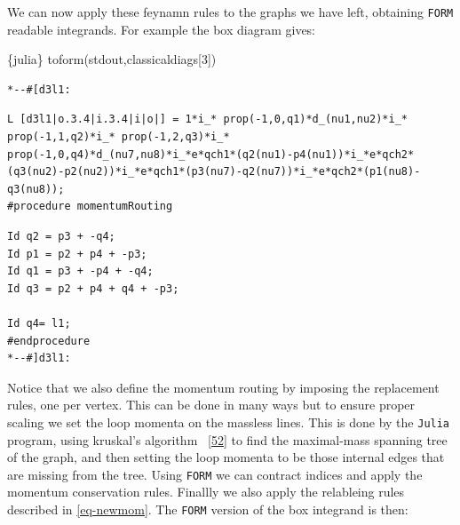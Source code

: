 \documentclass[
  10pt,
  a4paper,
  DIV=11,
  numbers=noendperiod,
  oneside]{scrreprt}
\newenvironment{Shaded}{\begin{snugshade}}{\end{snugshade}}
\newcommand{\DecValTok}[1]{\textcolor[rgb]{0.68,0.00,0.00}{#1}}
\newcommand{\InformationTok}[1]{\textcolor[rgb]{0.37,0.37,0.37}{#1}}
\newcommand{\NormalTok}[1]{\textcolor[rgb]{0.00,0.23,0.31}{#1}}
\DeclareRobustCommand{\[}{\begin{equation}}
\DeclareRobustCommand{\]}{\end{equation}}
\begin{document}
We can now apply these feynamn rules to the graphs we have left,
obtaining \texttt{FORM} readable integrands. For example the box diagram
gives:

\begin{Shaded}
\begin{Highlighting}[]
\InformationTok{\textasciigrave{}\textasciigrave{}\textasciigrave{}\{julia\}}
\NormalTok{toform(stdout,classicaldiags[}\DecValTok{3}\NormalTok{])}
\InformationTok{\textasciigrave{}\textasciigrave{}\textasciigrave{}}
\end{Highlighting}
\end{Shaded}

\begin{verbatim}
*--#[d3l1:
\end{verbatim}

\begin{verbatim}
L [d3l1|o.3.4|i.3.4|i|o|] = 1*i_* prop(-1,0,q1)*d_(nu1,nu2)*i_* prop(-1,1,q2)*i_* prop(-1,2,q3)*i_* prop(-1,0,q4)*d_(nu7,nu8)*i_*e*qch1*(q2(nu1)-p4(nu1))*i_*e*qch2*(q3(nu2)-p2(nu2))*i_*e*qch1*(p3(nu7)-q2(nu7))*i_*e*qch2*(p1(nu8)-q3(nu8));
#procedure momentumRouting
\end{verbatim}

\begin{verbatim}
Id q2 = p3 + -q4;
Id p1 = p2 + p4 + -p3;
Id q1 = p3 + -p4 + -q4;
Id q3 = p2 + p4 + q4 + -p3;

Id q4= l1;
#endprocedure
*--#]d3l1:
\end{verbatim}

Notice that we also define the momentum routing by imposing the
replacement rules, one per vertex. This can be done in many ways but to
ensure proper scaling we set the loop momenta on the massless lines.
This is done by the \texttt{Julia} program, using kruskal's algorithm
~{[}\protect\hyperlink{ref-Kruskal:1956}{52}{]} to find the maximal-mass
spanning tree of the graph, and then setting the loop momenta to be
those internal edges that are missing from the tree. Using \texttt{FORM}
we can contract indices and apply the momentum conservation rules.
Finallly we also apply the relableing rules described in
\ref{eq-newmom}. The \texttt{FORM} version of the box integrand is then:
\end{document}
